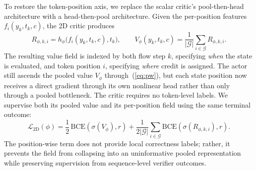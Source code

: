 To restore the token-position axis, we replace the scalar critic's pool-then-head architecture with a head-then-pool architecture. Given the per-position features $f_i(y_k,t_k,c)$, the 2D critic produces
\begin{equation}
R_{\phi,k,i}
=
h_\phi\bigl(f_i(y_k,t_k,c),t_k\bigr),
\qquad
V_\phi(y_k,t_k,c)
=
\frac{1}{|\mathcal G|}
\sum_{i\in\mathcal G}R_{\phi,k,i}.
\label{eq:critic2d}
\end{equation}
The resulting value field is indexed by both flow step $k$, specifying \emph{when} the state is evaluated, and token position $i$, specifying \emph{where} credit is assigned. The actor still ascends the pooled value $V_\phi$ through~(\ref{eq:pw}), but each state position now receives a direct gradient through its own nonlinear head rather than only through a pooled bottleneck. The critic requires no token-level labels. We supervise both its pooled value and its per-position field using the same terminal outcome:
\begin{equation}
\mathcal L_{\mathrm{2D}}(\phi)
=
\frac{1}{2}\,
\mathrm{BCE}\!\left(\sigma(V_\phi),r\right)
+
\frac{1}{2|\mathcal G|}
\sum_{i\in\mathcal G}
\mathrm{BCE}\!\left(\sigma(R_{\phi,k,i}),r\right).
\label{eq:critic2d_loss}
\end{equation}
The position-wise term does not provide local correctness labels; rather, it prevents the field from collapsing into an uninformative pooled representation while preserving supervision from sequence-level verifier outcomes.


